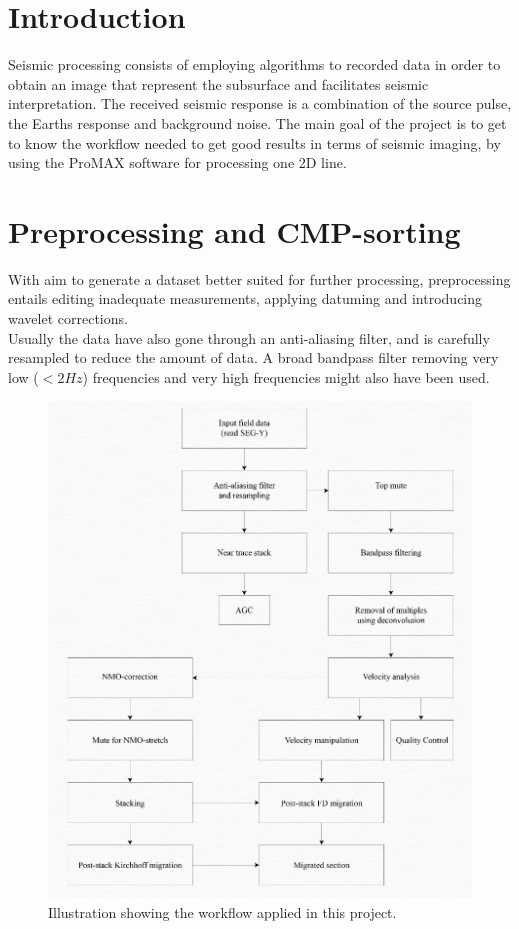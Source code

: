 \documentclass[10pt,a4paper]{article}
\begin{document}
\newpage

\tableofcontents

\newpage

\section{Introduction}

Seismic processing consists of employing algorithms to recorded data in order to obtain an image that represent the subsurface and facilitates seismic interpretation. The received seismic response is a combination of the source pulse, the Earths response and background noise. The main goal of the project is to get to know the workflow needed to get good results in terms of seismic imaging, by using the ProMAX software for processing one 2D line.


\section{Preprocessing and CMP-sorting}

With aim to generate a dataset better suited for further processing, preprocessing entails editing inadequate measurements, applying datuming and introducing wavelet corrections.\\
Usually the data have also gone through an anti-aliasing filter, and is carefully resampled to reduce the amount of data. A broad bandpass filter removing very low ($<2Hz$) frequencies and very high frequencies might also have been used.

\begin{figure}[H]
\centering
\includegraphics[scale=0.3]{wf3.jpg}
\caption{Illustration showing the workflow applied in this project.}
\label{wf}
\end{figure}
\end{document}
